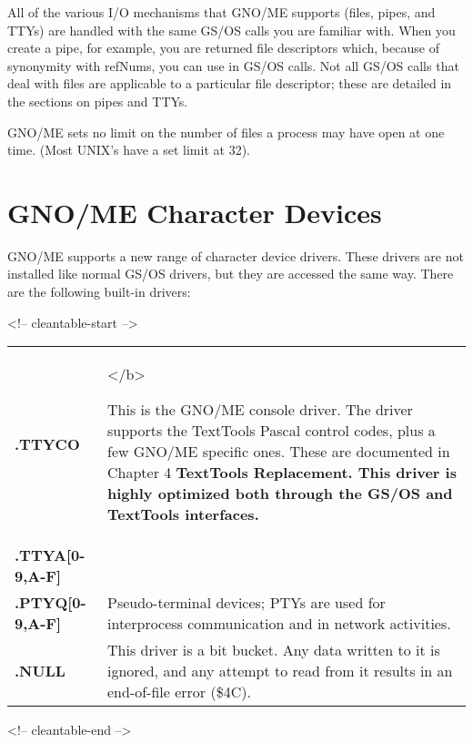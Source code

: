 \documentclass{report}
\begin{document}
All of the various I/O mechanisms that
GNO/ME supports (files, pipes, and TTYs) are handled with the
same GS/OS calls you are familiar with. When you create a pipe,
for example, you are returned file descriptors which, because of
synonymity with refNums, you can use in GS/OS calls. Not all
GS/OS calls that deal with files are applicable to a particular
file descriptor; these are detailed in the sections on pipes and
TTYs.

GNO/ME sets no limit on the number of files
a process may have open at one time. (Most UNIX's have a set
limit at 32).

\section{GNO/ME Character Devices}

GNO/ME supports a new range of character
device drivers. These drivers are not installed like normal GS/OS
drivers, but they are accessed the same way. There are the
following built-in drivers:

\begin{rawhtml}
<!-- cleantable-start -->
\end{rawhtml}
\begin{tabular}{ll}
\bf .TTYCO \rm	& 
\begin{minipage}[t]{8cm}
\begin{rawhtml}
</b>
\end{rawhtml}
	This is the GNO/ME console driver. The driver supports
	the TextTools Pascal control codes, plus a few GNO/ME
	specific ones. These are documented in Chapter 4
	\bf TextTools Replacement\rm. This driver is highly
	optimized both through the GS/OS and TextTools interfaces.
\end{minipage} \hfill \\

\index{.pty}
\index{.tty}
\bf .TTYA[0-9,A-F] \rm	\\
\bf .PTYQ[0-9,A-F] \rm &
\begin{minipage}[t]{8cm}
	Pseudo-terminal devices; PTYs are used for interprocess
	communication and in network activities.
\end{minipage} \hfill \\

\index{.NULL}
\bf .NULL \rm	& 
\begin{minipage}[t]{8cm}
	This driver is a bit bucket. Any data written	to it is
	ignored, and any attempt to read from it results in an
	end-of-file error (\$4C).
\end{minipage} \hfill \\
\end{tabular}
\begin{rawhtml}
<!-- cleantable-end -->
\end{rawhtml}
\end{document}
